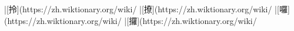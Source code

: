 |[拎](https://zh.wiktionary.org/wiki/%
|[撩](https://zh.wiktionary.org/wiki/%
|[囉](https://zh.wiktionary.org/wiki/%
|[攞](https://zh.wiktionary.org/wiki/%
